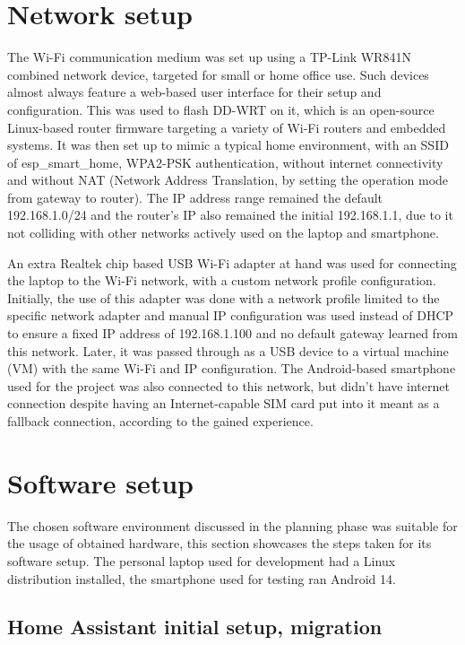 \section{Network setup}

The Wi-Fi communication medium was set up using a TP-Link WR841N combined network device, targeted for small or home office use. Such devices almost always feature a web-based user interface for their setup and configuration. This was used to flash DD-WRT on it, which is an open-source Linux-based router firmware targeting a variety of Wi-Fi routers and embedded systems. \cite{DDWRTHomepage} It was then set up to mimic a typical home environment, with an SSID of esp\_smart\_home, WPA2-PSK authentication, without internet connectivity and without NAT (Network Address Translation, by setting the operation mode from gateway to router). The IP address range remained the default 192.168.1.0/24 and the router's IP also remained the initial 192.168.1.1, due to it not colliding with other networks actively used on the laptop and smartphone.

An extra Realtek chip based USB Wi-Fi adapter at hand was used for connecting the laptop to the Wi-Fi network, with a custom network profile configuration. Initially, the use of this adapter was done with a network profile limited to the specific network adapter and manual IP configuration was used instead of DHCP to ensure a fixed IP address of 192.168.1.100 and no default gateway learned from this network. Later, it was passed through as a USB device to a virtual machine (VM) with the same Wi-Fi and IP configuration. The Android-based smartphone used for the project was also connected to this network, but didn't have internet connection despite having an Internet-capable SIM card put into it meant as a fallback connection, according to the gained experience.

\section{Software setup}

The chosen software environment discussed in the planning phase was suitable for the usage of obtained hardware, this section showcases the steps taken for its software setup. The personal laptop used for development had a Linux distribution installed, the smartphone used for testing ran Android 14.

\subsection{Home Assistant initial setup, migration}

